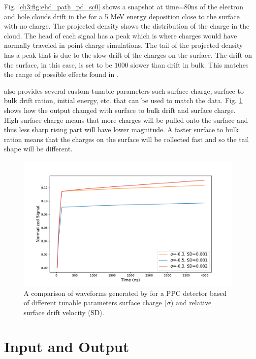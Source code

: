 Fig. \ref{ch3:fig:ehd_path_pd_sc0} shows a snapshot at time=$80$ns of the electron and hole clouds drift in the {\tdsim} for a 5 MeV energy deposition close to the surface with no charge. The projected density shows the distribution of the charge in the cloud. The head of each signal has a peak which is where charges would have normally traveled in point charge simulations. The tail of the projected density has a peak that is due to the slow drift of the charges on the surface. The drift on the surface, in this case, is set to be $1000$ slower than drift in bulk. This matches the range of possible effects found in \cite{MULLOWNEY201233}. 

{\tdsim} also provides several custom tunable parameters such surface charge, surface to bulk drift ration, initial energy, etc. that can be used to match the data. Fig. \ref{fig:wf_comp} shows how the output changed with surface to bulk drift and surface charge. High surface charge means that more charges will be pulled onto the surface and thus less sharp rising part will have lower magnitude. A faster surface to bulk ration means that the charges on the surface will be collected fast and so the tail shape will be different.

\begin{figure}[!htb]
    \includegraphics[trim={0.1cm 0.3cm 1.3cm 0.3cm},clip,width=0.99\linewidth]{ch3/figs/wf_comp.pdf}
    \caption{A comparison of waveforms generated by {\tdsim} for a {\Ltwo} PPC detector based of different tunable parameters surface charge ($\sigma$) and relative surface drift velocity (SD).}
    \label{fig:wf_comp}
\end{figure}



\section{Input and Output}

